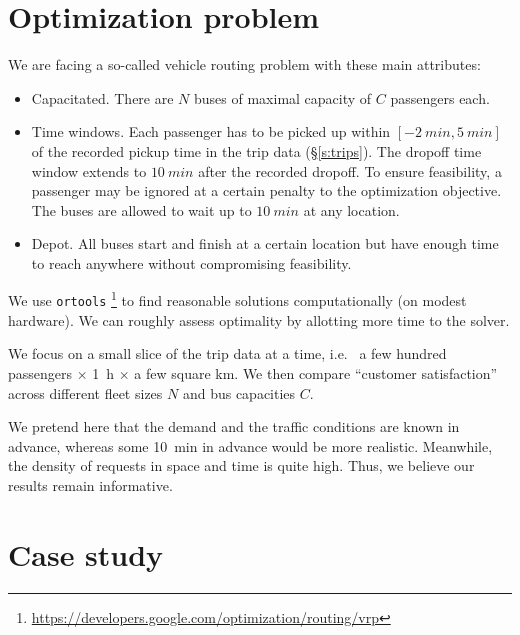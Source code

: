 \documentclass[12pt,notitlepage]{article}
\begin{document}
\section{Optimization problem}

We are facing
a so-called vehicle routing problem with these main attributes:
%
\begin{itemize}
\item
	Capacitated.
	There are $N$ buses of maximal capacity of $C$ passengers each.
\item
	Time windows.
	Each passenger has to be picked up
	within $[-\SI{2}{min}, \SI{5}{min}]$
	of
	the recorded pickup time in the trip data (\S\ref{s:trips}).
	The dropoff time window extends to $\SI{10}{min}$
	after the recorded dropoff.
	To ensure feasibility,
	a passenger may be ignored 
	at a certain penalty to the optimization objective.	
	The buses are allowed to wait up to $\SI{10}{min}$
	at any location.
\item
	Depot.
	All buses start and finish at a certain location
	but have enough time to reach anywhere
	without compromising feasibility.
\end{itemize}

%

We use \texttt{ortools}%
\footnote{\href{https://developers.google.com/optimization/routing/vrp}{https://developers.google.com/optimization/routing/vrp}}
to find reasonable solutions computationally (on modest hardware).
%
We can roughly assess optimality
by allotting more time to the solver.
%


%

We focus on a small slice of 
the trip data at a time,
i.e.~%
a few hundred passengers $\times$ \SI{1}{h} $\times$ a few square \si{km}.
%
We then compare ``customer satisfaction''
across different fleet sizes $N$ and bus capacities $C$.

%

We pretend here that the demand
and the traffic conditions
are known in advance,
whereas some \SI{10}{min} in advance
would be more realistic.
%
Meanwhile, the density of requests in space and time is quite high.
%
Thus, we believe our results remain informative.


\section[Case study]{Case study } \label{s:case}
\end{document}
